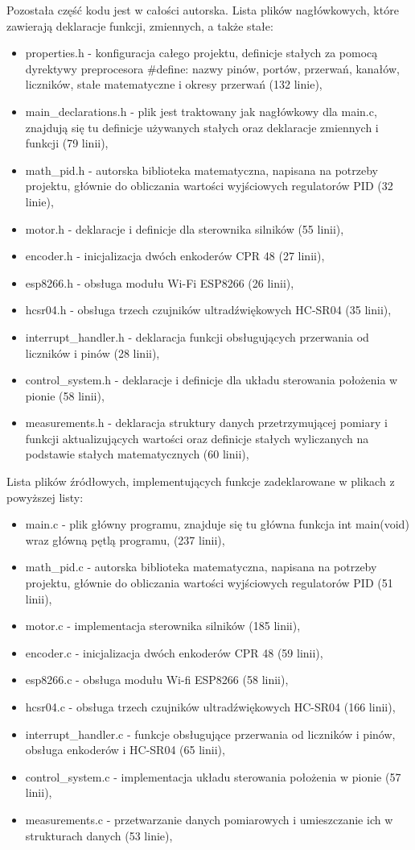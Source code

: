 \documentclass[a4paper,12pt,twoside,openany]{report}
\begin{document}
Pozostała część kodu jest w całości autorska. Lista plików nagłówkowych, które zawierają deklaracje funkcji, zmiennych, a także stałe:
\begin{itemize}
\item properties.h - konfiguracja całego projektu, definicje stałych za pomocą dyrektywy preprocesora \#define: nazwy pinów, portów, przerwań, kanałów, liczników, stałe matematyczne i okresy przerwań (132 linie),
\item main\_declarations.h - plik jest traktowany jak nagłówkowy dla main.c, znajdują się tu definicje używanych stałych oraz deklaracje zmiennych i funkcji (79 linii),
\item math\_pid.h - autorska biblioteka matematyczna, napisana na potrzeby projektu, głównie do obliczania wartości wyjściowych regulatorów PID (32 linie),
\item motor.h - deklaracje i definicje dla sterownika silników (55 linii),
\item encoder.h - inicjalizacja dwóch enkoderów CPR 48 (27 linii),
\item esp8266.h - obsługa modułu Wi-Fi ESP8266 (26 linii),
\item hcsr04.h - obsługa trzech czujników ultradźwiękowych HC-SR04 (35 linii),
\item interrupt\_handler.h - deklaracja funkcji obsługujących przerwania od liczników i pinów (28 linii),
\item control\_system.h - deklaracje i definicje dla układu sterowania położenia w pionie (58 linii),
\item measurements.h - deklaracja struktury danych przetrzymującej pomiary i funkcji aktualizujących wartości oraz definicje stałych wyliczanych na podstawie stałych matematycznych (60 linii),
\end{itemize}

Lista plików źródłowych, implementujących funkcje zadeklarowane w plikach z powyższej listy:
\begin{itemize}
\item main.c - plik główny programu, znajduje się tu główna funkcja int main(void) wraz główną pętlą programu, (237 linii),
\item math\_pid.c - autorska biblioteka matematyczna, napisana na potrzeby projektu, głównie do obliczania wartości wyjściowych regulatorów PID (51 linii),
\item motor.c - implementacja sterownika silników (185 linii),
\item encoder.c - inicjalizacja dwóch enkoderów CPR 48 (59 linii),
\item esp8266.c - obsługa modułu Wi-fi ESP8266 (58 linii),
\item hcsr04.c - obsługa trzech czujników ultradźwiękowych HC-SR04 (166 linii),
\item interrupt\_handler.c - funkcje obsługujące przerwania od liczników i pinów, obsługa enkoderów i HC-SR04 (65 linii),
\item control\_system.c - implementacja układu sterowania położenia w pionie (57 linii),
\item measurements.c - przetwarzanie danych pomiarowych i umieszczanie ich w strukturach danych (53 linie),
\end{itemize}
\end{document}
